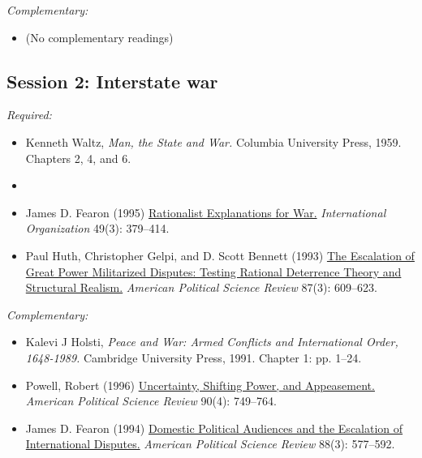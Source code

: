 \documentclass[12pt, a4paper]{article}
\begin{document}

\noindent\textit{Complementary:}

\begin{itemize}
  \item (No complementary readings)
\end{itemize}

\hline
\subsection*{Session 2: Interstate war}

\noindent\textit{Required:}

\begin{itemize}
  \item Kenneth Waltz, \textit{Man, the State and War.} Columbia University Press, 1959. Chapters 2, 4, and 6.
  \item
  \item James D. Fearon (1995) \href{https://doi.org/10.1017/S0020818300033324}{Rationalist Explanations for War.} \textit{International Organization} 49(3): 379--414.
  \item Paul Huth, Christopher Gelpi, and D. Scott Bennett (1993) \href{https://doi.org/10.2307/2938739}{The Escalation of Great Power Militarized Disputes: Testing Rational Deterrence Theory and Structural Realism.} \textit{American Political Science Review} 87(3): 609--623.
\end{itemize}




\noindent\textit{Complementary:}

\begin{itemize}
  \item Kalevi J Holsti, \textit{Peace and War: Armed Conflicts and International Order, 1648-1989.} Cambridge University Press, 1991. Chapter 1: pp. 1--24.
  \item Powell, Robert (1996) \href{https://doi.org/10.2307/2945840}{Uncertainty, Shifting Power, and Appeasement.} \textit{American Political Science Review} 90(4): 749--764.
  \item James D. Fearon (1994) \href{https://doi.org/10.2307/2944796}{Domestic Political Audiences and the Escalation of International Disputes.} \textit{American Political Science Review} 88(3): 577--592.
\end{itemize}
\end{document}
